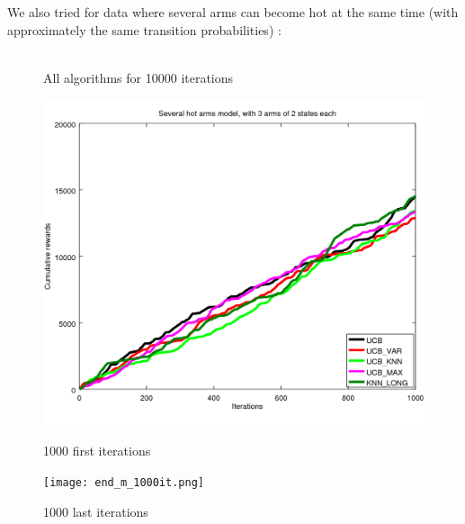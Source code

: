 \documentclass{article} %
\begin{document}
We also tried for data where several arms can become hot at the same time (with approximately the same transition probabilities) :

\begin{figure}[h]
	\begin{center}
		\includegraphics[width=1.0]{all_m_10000it.png}
	\end{center}
	\caption{All algorithms for 10000 iterations}
\end{figure}

\begin{figure}[h]
	\begin{minipage}[b]{.48\linewidth}
		\includegraphics[width=1.0\textwidth]{begin_m_1000it.png}
		\caption{1000 first iterations}
	\end{minipage}
	\hfill
	\begin{minipage}[b]{0.48\linewidth}
		\texttt{[image: end\_m\_1000it.png]}
		\caption{1000 last iterations}
	\end{minipage}
	\label{fig:f}
\end{figure}
\end{document}
